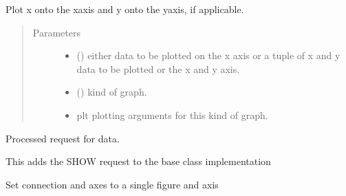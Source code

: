 \documentclass[letterpaper,10pt,english]{sphinxmanual}
\begin{document}
\begin{fulllineitems}
\begin{fulllineitems}
\end{fulllineitems}


\begin{fulllineitems}
\label{\detokenize{dalio.external:dalio.external.PyPlotGraph.plot}}
Plot x onto the x\sphinxhyphen{}axis and y onto the y\sphinxhyphen{}axis, if applicable.
\begin{quote}\begin{description}
\item[{Parameters}] \leavevmode\begin{itemize}
\item {} 
 () \textendash{} either data to be plotted on the x
axis or a tuple of x and y data to be plotted or the x and y
axis.

\item {} 
 () \textendash{} kind of graph.

\item {} 
 \textendash{} plt plotting arguments for this kind of graph.

\end{itemize}

\end{description}\end{quote}

\end{fulllineitems}


\begin{fulllineitems}
\label{\detokenize{dalio.external:dalio.external.PyPlotGraph.request}}
Processed request for data.

This adds the SHOW request to the base class implementation

\end{fulllineitems}


\begin{fulllineitems}
\label{\detokenize{dalio.external:dalio.external.PyPlotGraph.reset}}
Set connection and axes to a single figure and axis

\end{fulllineitems}


\end{fulllineitems}
\end{document}
